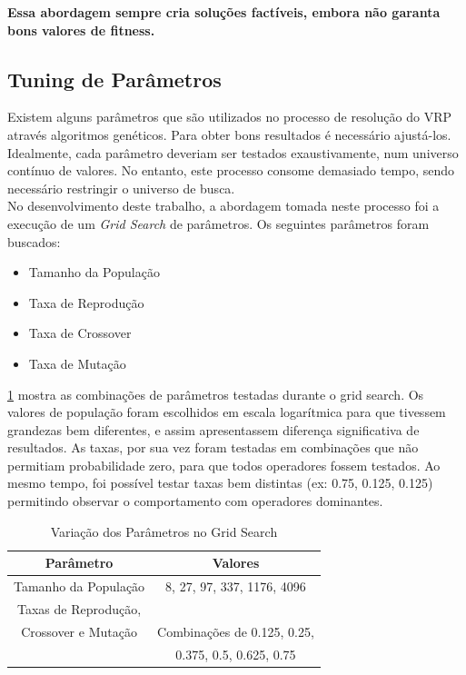 \documentclass[conference]{IEEEtran}
\begin{document}
\textbf{Essa abordagem sempre cria soluções factíveis, embora não garanta bons valores de fitness.}


\subsection{Tuning de Parâmetros}
Existem alguns parâmetros que são utilizados no processo de resolução do VRP através algoritmos genéticos. Para obter bons resultados é necessário ajustá-los. Idealmente, cada parâmetro deveriam ser testados exaustivamente, num universo contínuo de valores. No entanto, este processo consome demasiado tempo, sendo necessário restringir o universo de busca.\\
No desenvolvimento deste trabalho, a abordagem tomada neste processo foi a execução de um \textit{Grid Search} de parâmetros. Os seguintes parâmetros foram buscados:
\begin{itemize}
\item Tamanho da População
\item Taxa de Reprodução
\item Taxa de Crossover
\item Taxa de Mutação
\end{itemize}

\ref{table_tuning_parameters} mostra as combinações de parâmetros testadas durante o grid search. Os valores de população foram escolhidos em escala logarítmica para que tivessem grandezas bem diferentes, e assim apresentassem diferença significativa de resultados. As taxas, por sua vez foram testadas em combinações que não permitiam probabilidade zero, para que todos operadores fossem testados. Ao mesmo tempo, foi possível testar taxas bem distintas (ex: 0.75, 0.125, 0.125) permitindo observar o comportamento com operadores dominantes.

\begin{table}[!t]
\renewcommand{\arraystretch}{1.3}
\centering
\caption{Variação dos Parâmetros no Grid Search}
\label{table_tuning_parameters}
\begin{tabular}{|c||c|}
\hline
Parâmetro & Valores\\
\hline
Tamanho da População & 8, 27, 97, 337, 1176, 4096\\
\hline
Taxas de Reprodução, \\Crossover e Mutação & Combinações de 0.125, 0.25, \\ & 0.375, 0.5, 0.625, 0.75\\
\hline
\end{tabular}
\end{table}
\end{document}
